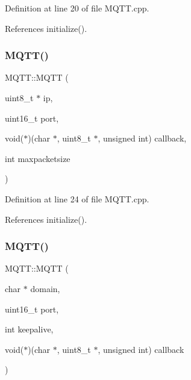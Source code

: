 Definition at line 20 of file M\+Q\+T\+T.\+cpp.



References initialize().

\mbox{\label{class_m_q_t_t_a39e00a946c41fbe9eb504577269569cc}} 
\subsubsection{\texorpdfstring{M\+Q\+T\+T()}{MQTT()}\hspace{0.1cm}{\footnotesize\ttfamily [5/9]}}
{\footnotesize\ttfamily M\+Q\+T\+T\+::\+M\+Q\+TT (\begin{DoxyParamCaption}\item[{uint8\+\_\+t $\ast$}]{ip,  }\item[{uint16\+\_\+t}]{port,  }\item[{void($\ast$)(char $\ast$, uint8\+\_\+t $\ast$, unsigned int)}]{callback,  }\item[{int}]{maxpacketsize }\end{DoxyParamCaption})}



Definition at line 24 of file M\+Q\+T\+T.\+cpp.



References initialize().

\mbox{\label{class_m_q_t_t_a799fede50157a7573f43582ccd429b5e}} 
\subsubsection{\texorpdfstring{M\+Q\+T\+T()}{MQTT()}\hspace{0.1cm}{\footnotesize\ttfamily [6/9]}}
{\footnotesize\ttfamily M\+Q\+T\+T\+::\+M\+Q\+TT (\begin{DoxyParamCaption}\item[{char $\ast$}]{domain,  }\item[{uint16\+\_\+t}]{port,  }\item[{int}]{keepalive,  }\item[{void($\ast$)(char $\ast$, uint8\+\_\+t $\ast$, unsigned int)}]{callback }\end{DoxyParamCaption})}




